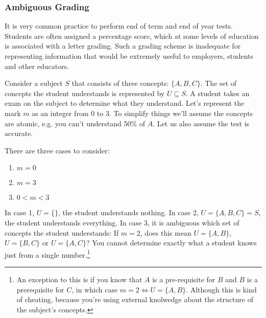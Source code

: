 
      \subsubsection{Ambiguous Grading}
        It is very common practice to perform end of term and end of year tests. Students are often assigned a percentage score, which at some levels of education is associated with a letter grading. Such a grading scheme is inadequate for representing information that would be extremely useful to employers, students and other educators.

        Consider a subject \(S\) that consists of three concepts: \(\{A, B, C\}\). The set of concepts the student understands is represented by \(U \subseteq S\). A student takes an exam on the subject to determine what they understand. Let's represent the mark \(m\) as an integer from 0 to 3. To simplify things we'll assume the concepts are atomic, e.g. you can't understand 50\% of \(A\). Let us also assume the test is accurate.

        There are three cases to consider:

        \begin{enumerate}
          \item \(m = 0\)
          \item \(m = 3\)
          \item \(0 < m < 3\)
        \end{enumerate}

        In case 1, \(U = \{\}\), the student understands nothing. In case 2, \(U = \{A, B, C\} = S\), the student understands everything. In case 3, it is ambiguous which set of concepts the student understands: If \(m = 2\), does this mean \(U = \{A, B\}\), \(U = \{B, C\}\) or \(U = \{A, C\}\)? You cannot determine exactly what a student knows just from a single number.\footnote{An exception to this is if you know that \(A\) is a pre-requisite for \(B\) and \(B\) is a prerequisite for \(C\), in which case \(m = 2 \iff U = \{A, B\}\). Although this is kind of cheating, because you're using external knolwedge about the structure of the subject's concepts.}


